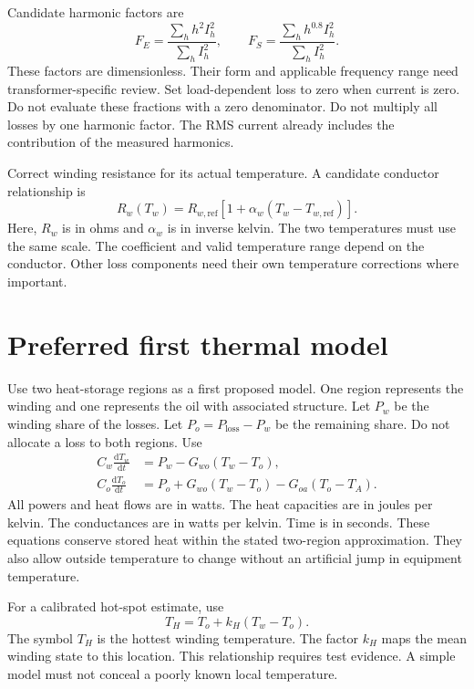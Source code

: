 \documentclass[11pt,a4paper]{report}
\newcommand{\dd}{\mathrm{d}}
\begin{document}
Candidate harmonic factors are
\begin{equation}
F_E=\frac{\sum_h h^2I_h^2}{\sum_h I_h^2},\qquad
F_S=\frac{\sum_h h^{0.8}I_h^2}{\sum_h I_h^2}.
\end{equation}
These factors are dimensionless.
Their form and applicable frequency range need transformer-specific review.
Set load-dependent loss to zero when current is zero.
Do not evaluate these fractions with a zero denominator.
Do not multiply all losses by one harmonic factor.
The RMS current already includes the contribution of the measured harmonics.

Correct winding resistance for its actual temperature.
A candidate conductor relationship is
\begin{equation}
R_w(T_w)=R_{w,\mathrm{ref}}\left[1+\alpha_w(T_w-T_{w,\mathrm{ref}})\right].
\end{equation}
Here, $R_w$ is in ohms and $\alpha_w$ is in inverse kelvin.
The two temperatures must use the same scale.
The coefficient and valid temperature range depend on the conductor.
Other loss components need their own temperature corrections where important.

\section{Preferred first thermal model}
Use two heat-storage regions as a first proposed model.
One region represents the winding and one represents the oil with associated structure.
Let $P_w$ be the winding share of the losses.
Let $P_o=P_{\mathrm{loss}}-P_w$ be the remaining share.
Do not allocate a loss to both regions.
Use
\begin{align}
C_w\frac{\dd T_w}{\dd t}&=P_w-G_{wo}(T_w-T_o),\\
C_o\frac{\dd T_o}{\dd t}&=P_o+G_{wo}(T_w-T_o)-G_{oa}(T_o-T_A).
\label{eq:transformer-thermal}
\end{align}
All powers and heat flows are in watts.
The heat capacities are in joules per kelvin.
The conductances are in watts per kelvin.
Time is in seconds.
These equations conserve stored heat within the stated two-region approximation.
They also allow outside temperature to change without an artificial jump in equipment temperature.

For a calibrated hot-spot estimate, use
\begin{equation}
T_H=T_o+k_H(T_w-T_o).
\end{equation}
The symbol $T_H$ is the hottest winding temperature.
The factor $k_H$ maps the mean winding state to this location.
This relationship requires test evidence.
A simple model must not conceal a poorly known local temperature.
\end{document}
